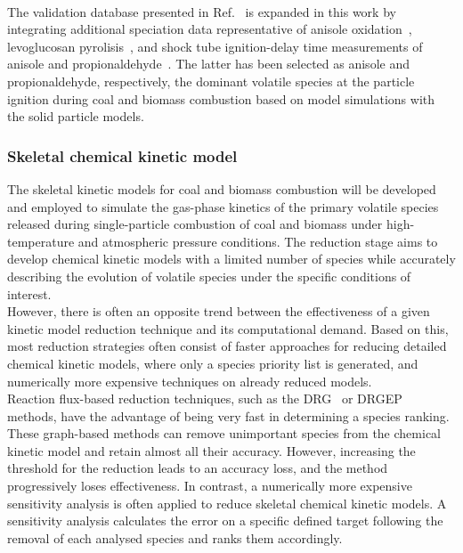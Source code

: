 \begin{refsection}
\\
The validation database presented in Ref.~\cite{Langer2023} is expanded in this work by integrating additional speciation data representative of anisole oxidation~\cite{Chen2022}, levoglucosan pyrolisis~\cite{Norinaga2013}, and shock tube ignition-delay time measurements of anisole and propionaldehyde~\cite{Pelucchi2015, AkihKumgehBergthorson2011}. The latter has been selected as anisole and propionaldehyde, respectively, the dominant volatile species at the particle ignition during coal and biomass combustion based on model simulations with the solid particle models.

 

\subsubsection{Skeletal chemical kinetic model}
The skeletal kinetic models for coal and biomass combustion will be developed and employed to simulate the gas-phase kinetics of the primary volatile species released during single-particle combustion of coal and biomass under high-temperature and atmospheric pressure conditions. The reduction stage aims to develop chemical kinetic models with a limited number of species while accurately describing the evolution of volatile species under the specific conditions of interest.
\\
However, there is often an opposite trend between the effectiveness of a given kinetic model reduction technique and its computational demand. Based on this, most reduction strategies often consist of faster approaches for reducing detailed chemical kinetic models, where only a species priority list is generated, and numerically more expensive techniques on already reduced models.
\\
Reaction flux-based reduction techniques, such as the DRG~\cite{Lu2005, Lu2020} or DRGEP~\cite{PepiotDesjardins2008a} methods, have the advantage of being very fast in determining a species ranking. These graph-based methods can remove unimportant species from the chemical kinetic model and retain almost all their accuracy. However, increasing the threshold for the reduction leads to an accuracy loss, and the method progressively loses effectiveness. In contrast, a numerically more expensive sensitivity analysis is often applied to reduce skeletal chemical kinetic models. A sensitivity analysis calculates the error on a specific defined target following the removal of each analysed species and ranks them accordingly.

\end{refsection}
